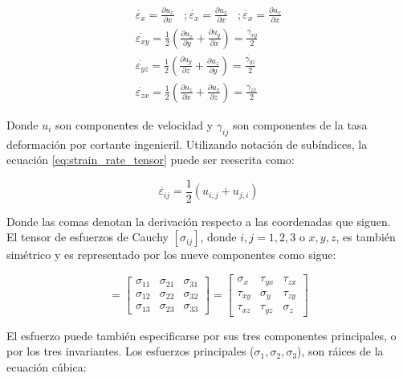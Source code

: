 \begin{eqnarray} \label{eq:strain_rate_tensor}
\dot{\varepsilon_x} = \frac{\partial u_x}{\partial x} \,\,\,\,\, ;
\dot{\varepsilon_x} = \frac{\partial u_x}{\partial x}  \,\,\,\,\, ;
\dot{\varepsilon_x} = \frac{\partial u_x}{\partial x} \\
\dot{\varepsilon_{xy}} = \frac{1}{2} \left( \frac{\partial u_x}{\partial y} + \frac{\partial u_y}{\partial x} \right) = \frac{\dot{\gamma_{xy}}}{2} \\
\dot{\varepsilon_{yz}} = \frac{1}{2} \left( \frac{\partial u_y}{\partial z} + \frac{\partial u_z}{\partial y} \right) = \frac{\dot{\gamma_{yz}}}{2} \\
\dot{\varepsilon_{zx}} = \frac{1}{2} \left( \frac{\partial u_z}{\partial x} + \frac{\partial u_x}{\partial z} \right) = \frac{\dot{\gamma_{zx}}}{2}
\end{eqnarray}

Donde $u_i$ son componentes de velocidad y $\gamma_{ij}$ son componentes de la tasa 
deformación por cortante ingenieril. Utilizando notación de subíndices, la ecuación 
\ref{eq:strain_rate_tensor} puede ser reescrita como:

\begin{equation}
\dot{\varepsilon_{ij}} = \frac{1}{2} \left( u_{i,j} + u_{j,i} \right)
\end{equation}

Donde las comas denotan la derivación respecto a las coordenadas que siguen.\\

El tensor de esfuerzos de Cauchy $[\sigma_{ij}]$, donde $i,j = 1,2,3$ o $x,y,z$, es 
también simétrico y es representado por los nueve componentes como sigue:

\begin{equation}
[\sigma_{ij}] = 
\begin{bmatrix}
\sigma_{11} & \sigma_{21} & \sigma_{31} \\
\sigma_{12} & \sigma_{22} & \sigma_{32} \\
\sigma_{13} & \sigma_{23} & \sigma_{33} 
\end{bmatrix}
=
\begin{bmatrix}
\sigma_x & \tau_{yx} & \tau_{zx} \\
\tau_{xy} & \sigma_y & \tau_{zy} \\
\tau_{xz} & \tau_{yz} & \sigma_z 
\end{bmatrix}
\end{equation}

El esfuerzo puede también especificarse por sus tres componentes principales, o por 
los tres invariantes. Los esfuerzos principales ($\sigma_1, \sigma_2, \sigma_3$), son 
ráices de la ecuación cúbica:

